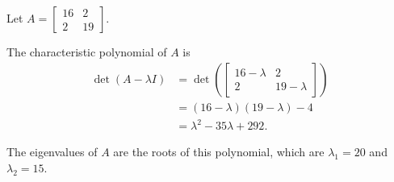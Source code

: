 \documentclass{ximera}
\begin{document}
\begin{example}\label{ex:similarityDiagonal}
Let $A = \begin{bmatrix}
16 & 2\\2& 19
\end{bmatrix}$.  
\begin{explanation}
The characteristic polynomial of $A$ is
\begin{align*}
\det(A - \lambda I) &= \det\left(\begin{bmatrix}
16-\lambda & 2\\2& 19-\lambda
\end{bmatrix}\right)\\
&= (16-\lambda)(19-\lambda) - 4\\
&= \lambda^2 - 35\lambda + 292.
\end{align*}

The eigenvalues of $A$ are the roots of this polynomial, which are $\lambda_1=20$ and $\lambda_2=15$. 


\end{explanation}
\end{example}
\end{document}
